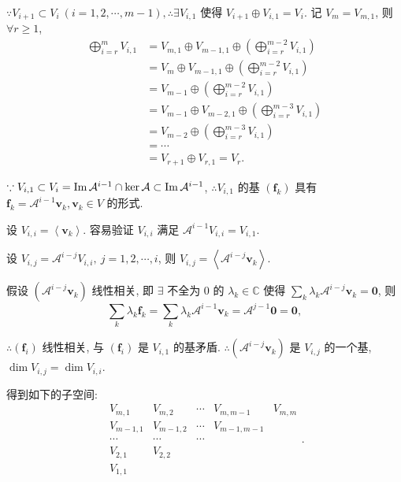 \documentclass[color=black,device=normal,lang=cn,mode=geye]{elegantnote}
\begin{document}
$\because V_{i+1}\subset V_i\ (i=1,2,\cdots,m-1),\therefore\exists V_{i,1}$ 使得 $V_{i+1}\oplus V_{i,1}=V_i$. 记 $V_m=V_{m,1}$, 则 $\forall r\geq1$,
\begin{equation}\label{eq4.7}
    \begin{aligned}
        \bigoplus\limits_{i=r}^mV_{i,1} & =V_{m,1}\oplus V_{m-1,1}\oplus\left(\bigoplus\limits_{i=r}^{m-2}V_{i,1}\right) \\
        & =V_m\oplus V_{m-1,1}\oplus\left(\bigoplus\limits_{i=r}^{m-2}V_{i,1}\right) \\
        & =V_{m-1}\oplus\left(\bigoplus\limits_{i=r}^{m-2}V_{i,1}\right) \\
        & =V_{m-1}\oplus V_{m-2,1}\oplus\left(\bigoplus\limits_{i=r}^{m-3}V_{i,1}\right) \\
        & =V_{m-2}\oplus\left(\bigoplus\limits_{i=r}^{m-3}V_{i,1}\right) \\
        & =\cdots \\
        & =V_{r+1}\oplus V_{r,1}=V_r.
    \end{aligned}
\end{equation}

$\because V_{i,1}\subset V_i=\operatorname{Im} \mathcal{A}^{i-1}\cap\ker\mathcal{A}\subset\operatorname{Im} \mathcal{A}^{i-1}$, $\therefore V_{i,1}$ 的基 $(\boldsymbol{f}_k)$ 具有 $\boldsymbol{f}_k=\mathcal{A}^{i-1}\boldsymbol{v}_k,\boldsymbol{v}_k\in V$ 的形式.

设 $V_{i,i}=\left<\boldsymbol{v}_k\right>$. 容易验证 $V_{i,i}$ 满足 $\mathcal{A}^{i-1}V_{i,i}=V_{i,1}$.

设 $V_{i,j}=\mathcal{A}^{i-j}V_{i,i},\ j=1,2,\cdots,i$, 则 $V_{i,j}=\left<\mathcal{A}^{i-j}\boldsymbol{v}_k\right>$.

假设 $(\mathcal{A}^{i-j}\boldsymbol{v}_k)$ 线性相关, 即 $\exists$ 不全为 $0$ 的 $\lambda_k\in\mathbb{C}$ 使得 $\sum\limits_k\lambda_k\mathcal{A}^{i-j}\boldsymbol{v}_k=\boldsymbol{0}$, 则
\[\sum\limits_k\lambda_k\boldsymbol{f}_k=\sum\limits_k\lambda_k\mathcal{A}^{i-1}\boldsymbol{v}_k=\mathcal{A}^{j-1}\boldsymbol{0}=\boldsymbol{0},\]

$\therefore(\boldsymbol{f}_i)$ 线性相关, 与 $(\boldsymbol{f}_i)$ 是 $V_{i,1}$ 的基矛盾. $\therefore(\mathcal{A}^{i-j}\boldsymbol{v}_k)$ 是 $V_{i,j}$ 的一个基, $\dim V_{i,j}=\dim V_{i,i}$.

得到如下的子空间:
\begin{equation}\label{eq4.8}
    \begin{matrix}
        V_{m,1} & V_{m,2} & \cdots & V_{m,m-1} & V_{m,m} \\
        V_{m-1,1} & V_{m-1,2} & \cdots & V_{m-1,m-1} \\
        \cdots & \cdots & \cdots \\
        V_{2,1} & V_{2,2} \\
        V_{1,1}
    \end{matrix}.
\end{equation}
\end{document}
